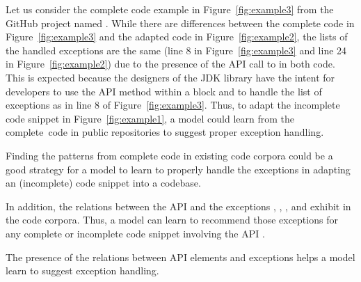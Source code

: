 






Let us consider the complete code example in Figure~\ref{fig:example3}
from the GitHub project named . While there are
differences between the complete code in Figure~\ref{fig:example3} and
the adapted code in Figure~\ref{fig:example2}, the lists of the
handled exceptions are the same (line 8 in Figure~\ref{fig:example3}
and line 24 in Figure~\ref{fig:example2}) due to the presence of the
API call to  in both code. This is expected
because the designers of the JDK library have the intent for
developers to use the API method  within a
 block and to handle the list of exceptions as in line 8 of
Figure~\ref{fig:example3}. Thus, to adapt the incomplete code snippet
in Figure~\ref{fig:example1}, a model could learn from the
complete~code in public repositories to suggest proper exception
handling.

\begin{Observation} 
\label{ob2}
Finding the patterns from complete code in existing code corpora could
be a good strategy for a model to learn to properly handle the
  exceptions in adapting an (incomplete) code snippet into a
codebase.
\end{Observation}

In addition, the relations between the API
 and the exceptions
, ,
, and
 exhibit in the code corpora. Thus, a
model can learn to recommend those exceptions for any complete or
incomplete code snippet involving the API .

\begin{Observation} 
\label{ob3}
The presence of the relations between API elements and exceptions
helps a model learn to suggest exception handling.
\end{Observation}





